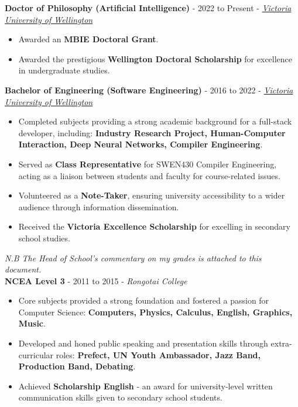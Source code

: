 \documentclass[9pt]{developercv}
\begin{document}


\textbf{Doctor of Philosophy (Artificial Intelligence)} - 2022 to Present - \emph{\href{https://www.wgtn.ac.nz/}{Victoria University of Wellington}}
\begin{itemize}
    \item Awarded an \textbf{MBIE Doctoral Grant}.
    \item Awarded the prestigious \textbf{Wellington Doctoral Scholarship} for excellence in undergraduate studies.
\end{itemize}

\textbf{Bachelor of Engineering (Software Engineering)} - 2016 to 2022 - \emph{\href{https://www.wgtn.ac.nz/}{Victoria University of Wellington}}
\begin{itemize}
    \item Completed subjects providing a strong academic background for a full-stack developer, including: \textbf{Industry Research Project, Human-Computer Interaction, Deep Neural Networks, Compiler Engineering}.
    \item Served as \textbf{Class Representative} for SWEN430 Compiler Engineering, acting as a liaison between students and faculty for course-related issues.
    \item Volunteered as a \textbf{Note-Taker}, ensuring university accessibility to a wider audience through information dissemination.
    \item Received the \textbf{Victoria Excellence Scholarship} for excelling in secondary school studies.
\end{itemize}
\emph{N.B The Head of School's commentary on my grades is attached to this document.} \\

\textbf{NCEA Level 3} - 2011 to 2015 - \emph{Rongotai College}
\begin{itemize}
    \item Core subjects provided a strong foundation and fostered a passion for Computer Science: \textbf{Computers, Physics, Calculus, English, Graphics, Music}.
    \item Developed and honed public speaking and presentation skills through extra-curricular roles: \textbf{Prefect, UN Youth Ambassador, Jazz Band, Production Band, Debating}.
    \item Achieved \textbf{Scholarship English} - an award for university-level written communication skills given to secondary school students.
\end{itemize}
\end{document}
